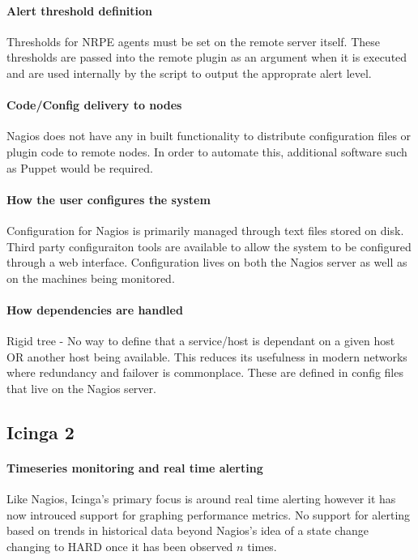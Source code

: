 \documentclass[10pt]{article}
\begin{document}
	\paragraph{Alert threshold definition}
	Thresholds for NRPE agents must be set on the remote server itself.  These thresholds are passed
	into the remote plugin as an argument when it is executed and are used internally by the script to
	output the approprate alert level.
	
	\paragraph{Code/Config delivery to nodes}
	Nagios does not have any in built functionality to distribute configuration files or plugin code to
	remote nodes. In order to automate this, additional software such as Puppet would be required.
	
	\paragraph{How the user configures the system}
	Configuration for Nagios is primarily managed through text files stored on disk.  Third party
	configuraiton tools are available to allow the system to be configured through a web interface.
	Configuration lives on both the Nagios server as well as on the machines being monitored.
	
	\paragraph{How dependencies are handled}
	Rigid tree - No way to define that a service/host is dependant on a given host OR another host being
	available.  This reduces its usefulness in modern networks where redundancy and failover is
	commonplace. These are defined in config files that live on the Nagios server.
	
	\subsection{Icinga 2}
	\paragraph{Timeseries monitoring and real time alerting}
	Like Nagios, Icinga's primary focus is around real time alerting however it has now introuced support
	for graphing performance metrics.  No support for alerting based on trends in historical data beyond
	Nagios's idea of a state change changing to HARD once it has been observed $n$ times.
	
\end{document}
